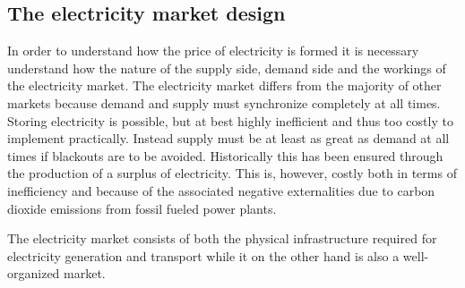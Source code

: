 \label{sec:theory}

\subsection{The electricity market design}
\label{subsec:t_market}
In order to understand how the price of electricity is formed it is necessary understand how the nature of the supply side, demand side and the workings of the electricity market. The electricity market differs from the majority of other markets because demand and supply must synchronize completely at all times. Storing electricity is possible, but at best highly inefficient and thus too costly to implement practically. Instead supply must be at least as great as demand at all times if blackouts are to be avoided. Historically this has been ensured through the production of a surplus of electricity. This is, however, costly both in terms of inefficiency and because of the associated negative externalities due to carbon dioxide emissions from fossil fueled power plants.
\medskip

The electricity market consists of both the physical infrastructure required for electricity generation and transport while it on the other hand is also a well-organized market.
\medskip

